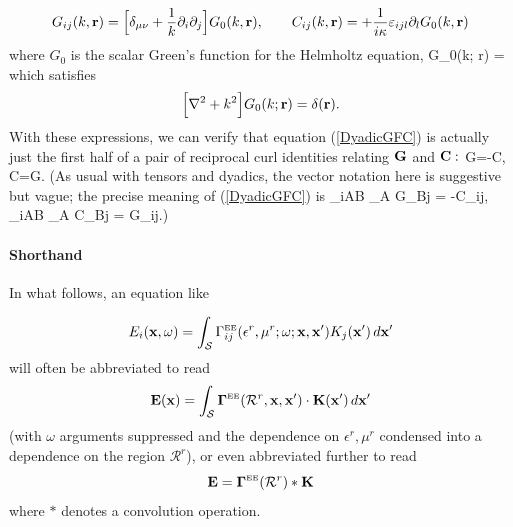 \documentclass[letterpaper]{article}
\begin{document}
\begin{equation}
G_{ij}(k,\mathbf{r}) =
  \Big[\delta_{\mu\nu} +\frac{1}{k} \partial_i \partial_j \Big]
  G_0(k, \mathbf{r}), \qquad
  C_{ij}(k, \mathbf{r}) = +\frac{1}{i\kappa} \varepsilon_{ijl} 
                          \partial_l G_0(k, \mathbf{r})
\label{GCfromG0}
\end{equation}
where $G_0$ is the scalar Green's function for the Helmholtz equation,
{G_0(k; \vb r)
   =
}
which satisfies
$$ \Big[ \nabla^2 + k^2 \Big] G_0(k; \mathbf{r})
   =\delta(\mathbf{r}).
$$
With these expressions, we can verify that equation (\ref{DyadicGFC}) 
is actually just the first half of a pair of reciprocal curl identities 
relating $\mathbf{G}$ and $\mathbf{C}:$
{
   \nabla \times \vb G=-\vb C, 
\qquad
   \nabla \times \vb C=\vb G.
}
(As usual with tensors and dyadics, the vector notation here
is suggestive but vague; the precise meaning of (\ref{DyadicGFC}) is 
{
    \varepsilon_{iAB} \partial_A G_{Bj} = -C_{ij},
   \qquad
    \varepsilon_{iAB} \partial_A C_{Bj} = G_{ij}.)
}



\paragraph{Shorthand} In what follows, an equation like 

$$ E_i(\mathbf{x}, \omega) = 
   \int_{\mathcal S} 
     \Gamma^{\hbox{\tiny{EE}}}_{ij}(\epsilon^r, \mu^r; \omega; 
                          \mathbf{x}, \mathbf{x}^\prime) 
     K_j(\mathbf{x}^\prime)
    \, d\mathbf{x}^\prime
$$
will often be abbreviated to read 
$$ \mathbf{E}(\mathbf{x}) = 
    \int_{\mathcal S} 
      \boldsymbol{\Gamma}^{\hbox{\tiny{EE}}}(\mathcal{R}^r, \mathbf{x}, \mathbf{x}^\prime) 
         \cdot \mathbf{K}(\mathbf{x}^\prime) 
    \, d\mathbf{x}^\prime
$$
(with $\omega$ arguments suppressed and the dependence 
on $\epsilon^r, \mu^r$ condensed into a dependence
on the region $\mathcal{R}^r$), or even abbreviated further
to read
$$ \mathbf{E} = \boldsymbol{\Gamma}^{\hbox{\tiny{EE}}}(\mathcal{R}^r) * \mathbf{K} $$
where $*$ denotes a convolution operation.

\newpage
\end{document}
